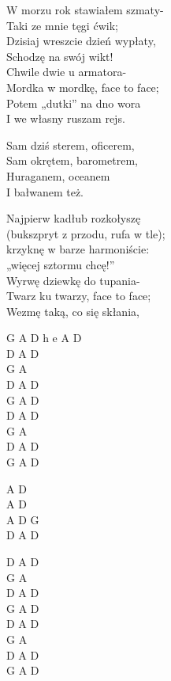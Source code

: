 \begin{textn}
    \ifchorded{\hfill\break}
    W morzu rok stawiałem szmaty-\\
    Taki ze mnie tęgi ćwik;\\
    Dzisiaj wreszcie dzień wypłaty,\\
    Schodzę na swój wikt!\\
    Chwile dwie u armatora-\\
    Mordka w mordkę, face to face;\\
    Potem „dutki” na dno wora\\
    I we własny ruszam rejs.

    Sam dziś sterem, oficerem,\\
    Sam okrętem, barometrem,\\
    Huraganem, oceanem\\
    I bałwanem też.

    Najpierw kadłub rozkołyszę\\
    (bukszpryt z przodu, rufa w tle);\\
    krzyknę w barze harmoniście:\\
    „więcej sztormu chcę!”\\
    Wyrwę dziewkę do tupania-\\
    Twarz ku twarzy, face to face;\\
    Wezmę taką, co się skłania,
\end{textn}
\begin{chordw}
    G A D h e A D\\
    D A D\\
    G A\\
    D A D\\
    G A D\\
    D A D\\
    G A\\
    D A D\\
    G A D

    A D\\
    A D\\
    A D G\\
    D A D

    D A D\\
    G A\\
    D A D\\
    G A D\\
    D A D\\
    G A\\
    D A D\\
    G A D
\end{chordw}